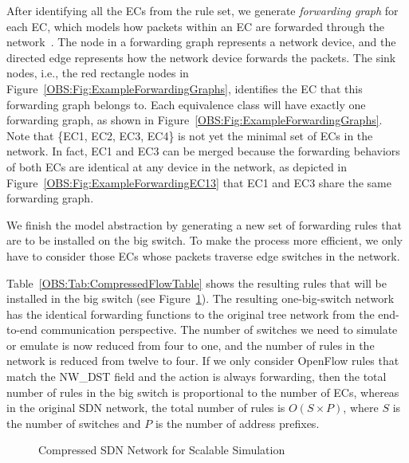 After identifying all the ECs from the rule set, we generate \textit{forwarding graph} for each EC, which models how packets within an EC are forwarded through the network~\cite{Veriflow}.
The node in a forwarding graph represents a network device, and the directed edge represents how the network device forwards the packets.
The sink nodes, i.e., the red rectangle nodes in Figure~\ref{OBS:Fig:ExampleForwardingGraphs}, identifies the EC that this forwarding graph belongs to.
Each equivalence class will have exactly one forwarding graph, as shown in Figure~\ref{OBS:Fig:ExampleForwardingGraphs}.
Note that \{EC1, EC2, EC3, EC4\} is not yet the minimal set of ECs in the network.
In fact, EC1 and EC3 can be merged because the forwarding behaviors of both ECs are identical at any device in the network,
as depicted in Figure~\ref{OBS:Fig:ExampleForwardingEC13} that EC1 and EC3 share the same forwarding graph.

We finish the model abstraction by generating a new set of forwarding rules that are to be installed on the big switch.
To make the process more efficient, we only have to consider those ECs whose packets traverse edge switches in the network.

Table~\ref{OBS:Tab:CompressedFlowTable} shows the resulting rules that will be installed in the big switch (see Figure~\ref{OBS:Fig:ExampleBigSwitch}).
The resulting one-big-switch network has the identical forwarding functions to the original tree network from the end-to-end communication perspective.
The number of switches we need to simulate or emulate is now reduced from four to one, and the number of rules in the network is reduced from twelve to four.
If we only consider OpenFlow rules that match the NW\_DST field and the action is always forwarding,
then the total number of rules in the big switch is proportional to the number of ECs,
whereas in the original SDN network, the total number of rules is $O(S\times P)$,
where $S$ is the number of switches and $P$ is the number of address prefixes.

\begin{figure}[t]
    \centering
    \caption{Compressed SDN Network for Scalable Simulation}
    \label{OBS:Fig:ExampleBigSwitch}
\end{figure}
